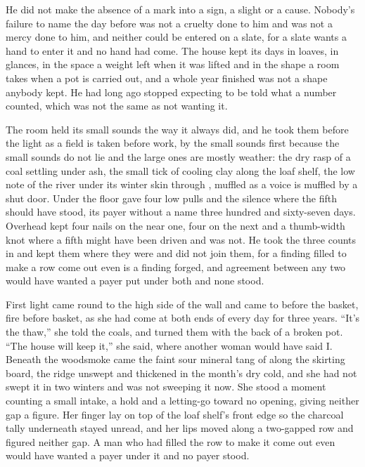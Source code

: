 He did not make the absence of a mark into a sign, a slight or a cause. Nobody's failure to name the day before was not a cruelty done to him and was not a mercy done to him, and neither could be entered on a slate, for a slate wants a hand to enter it and no hand had come. The house kept its days in loaves, in glances, in the space a weight left when it was lifted and in the shape a room takes when a pot is carried out, and a whole year finished was not a shape anybody kept. He had long ago stopped expecting to be told what a number counted, which was not the same as not wanting it.

The room held its small sounds the way it always did, and he took them before the light as a field is taken before work, by the small sounds first because the small sounds do not lie and the large ones are mostly weather: the dry rasp of a coal settling under ash, the small tick of cooling clay along the loaf shelf, the low note of the river under its winter skin through , muffled as a voice is muffled by a shut door. Under the floor  gave four low pulls and the silence where the fifth should have stood, its payer without a name three hundred and sixty-seven days. Overhead  kept four nails on the near one, four on the next and a thumb-width knot where a fifth might have been driven and was not. He took the three counts in and kept them where they were and did not join them, for a finding filled to make a row come out even is a finding forged, and agreement between any two would have wanted a payer put under both and none stood.

\scenebreak

First light came round to the high side of the wall and  came to  before the basket, fire before basket, as she had come at both ends of every day for three years. “It's the thaw,” she told the coals, and turned them with the back of a broken pot. “The house will keep it,” she said, where another woman would have said I. Beneath the woodsmoke came the faint sour mineral tang of  along the skirting board, the ridge unswept and thickened in the month's dry cold, and she had not swept it in two winters and was not sweeping it now. She stood a moment counting a small intake, a hold and a letting-go toward no opening, giving neither gap a figure. Her finger lay on top of the loaf shelf's front edge so the charcoal tally underneath stayed unread, and her lips moved along a two-gapped row and figured neither gap. A man who had filled the row to make it come out even would have wanted a payer under it and no payer stood.

